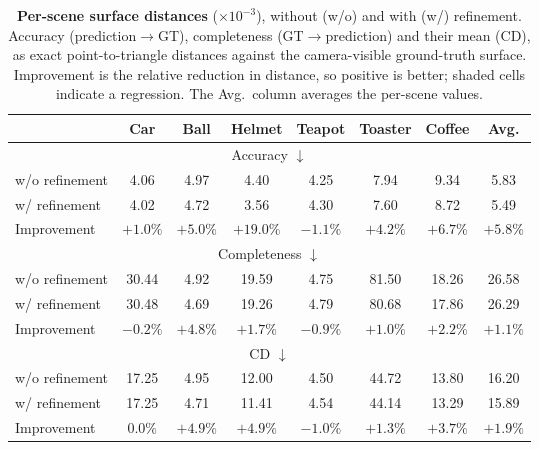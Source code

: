 \begin{table}[t]
\centering
\footnotesize
\setlength{\tabcolsep}{3pt}
\caption{\textbf{Per-scene surface distances} ($\times10^{-3}$), without (w/o) and
with (w/) refinement. Accuracy (prediction$\rightarrow$GT), completeness
(GT$\rightarrow$prediction) and their mean (CD), as exact point-to-triangle
distances against the camera-visible ground-truth surface. Improvement is the
relative reduction in distance, so positive is better; shaded cells indicate a
regression. The Avg.\ column averages the per-scene values.}
\label{tab:refinement_chamfer}
\begin{tabular}{@{}lccccccc@{}}
\toprule
& Car & Ball & Helmet & Teapot & Toaster & Coffee & Avg. \\
\midrule
\multicolumn{8}{c}{Accuracy $\downarrow$} \\
\midrule
w/o refinement & 4.06 & 4.97 & 4.40 & 4.25 & 7.94 & 9.34 & 5.83 \\
w/ refinement  & 4.02 & 4.72 & 3.56 & 4.30 & 7.60 & 8.72 & 5.49 \\
\cmidrule(lr){1-8}
Improvement & $+1.0\%$ & $+5.0\%$ & $+19.0\%$ & \cellcolor{red!15} $-1.1\%$ & $+4.2\%$ & $+6.7\%$ & $+5.8\%$ \\
\midrule
\multicolumn{8}{c}{Completeness $\downarrow$} \\
\midrule
w/o refinement & 30.44 & 4.92 & 19.59 & 4.75 & 81.50 & 18.26 & 26.58 \\
w/ refinement  & 30.48 & 4.69 & 19.26 & 4.79 & 80.68 & 17.86 & 26.29 \\
\cmidrule(lr){1-8}
Improvement & \cellcolor{red!15} $-0.2\%$ & $+4.8\%$ & $+1.7\%$ & \cellcolor{red!15} $-0.9\%$ & $+1.0\%$ & $+2.2\%$ & $+1.1\%$ \\
\midrule
\multicolumn{8}{c}{CD $\downarrow$} \\
\midrule
w/o refinement & 17.25 & 4.95 & 12.00 & 4.50 & 44.72 & 13.80 & 16.20 \\
w/ refinement  & 17.25 & 4.71 & 11.41 & 4.54 & 44.14 & 13.29 & 15.89 \\
\cmidrule(lr){1-8}
Improvement & $0.0\%$ & $+4.9\%$ & $+4.9\%$ & \cellcolor{red!15} $-1.0\%$ & $+1.3\%$ & $+3.7\%$ & $+1.9\%$ \\
\bottomrule
\end{tabular}
\end{table}